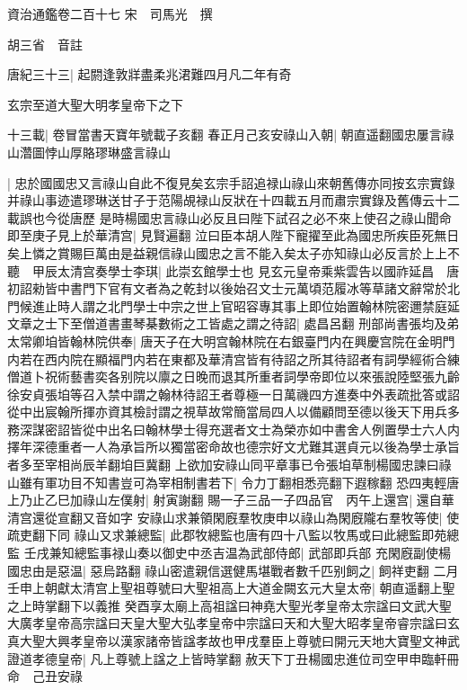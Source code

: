 資治通鑑卷二百十七
宋　司馬光　撰

胡三省　音註

唐紀三十三|{
	起閼逢敦牂盡柔兆涒難四月凡二年有奇}


玄宗至道大聖大明孝皇帝下之下

十三載|{
	卷冒當書天寶年號載子亥翻}
春正月己亥安祿山入朝|{
	朝直遥翻國忠屢言祿山濳圖悖山厚賂璆琳盛言祿山}


|{
	忠於國國忠又言祿山自此不復見矣玄宗手詔追禄山祿山來朝舊傳亦同按玄宗實錄并祿山事迹遣璆琳送甘子于范陽覘禄山反狀在十四載五月而肅宗實錄及舊傳云十二載誤也今從唐歷}
是時楊國忠言祿山必反且曰陛下試召之必不來上使召之祿山聞命即至庚子見上於華清宫|{
	見賢遍翻}
泣曰臣本胡人陛下寵擢至此為國忠所疾臣死無日矣上憐之賞賜巨萬由是益親信祿山國忠之言不能入矣太子亦知祿山必反言於上上不聽　甲辰太清宫奏學士李琪|{
	此崇玄館學士也}
見玄元皇帝乘紫雲告以國祚延昌　唐初詔勑皆中書門下官有文者為之乾封以後始召文士元萬頃范履冰等草諸文辭常於北門候進止時人謂之北門學士中宗之世上官昭容專其事上即位始置翰林院密邇禁庭延文章之士下至僧道書畫琴棊數術之工皆處之謂之待詔|{
	處昌呂翻}
刑部尚書張均及弟太常卿垍皆翰林院供奉|{
	唐天子在大明宫翰林院在右銀臺門内在興慶宫院在金明門内若在西内院在顯福門内若在東都及華清宫皆有待詔之所其待詔者有詞學經術合練僧道卜祝術藝書奕各别院以廪之日晚而退其所重者詞學帝即位以來張說陸堅張九齡徐安貞張垍等召入禁中謂之翰林待詔王者尊極一日萬禨四方進奏中外表疏批答或詔從中出宸翰所揮亦資其檢討謂之視草故常簡當局四人以備顧問至德以後天下用兵多務深謀密詔皆從中出名曰翰林學士得充選者文士為榮亦如中書舍人例置學士六人内擇年深德重者一人為承旨所以獨當密命故也德宗好文尤難其選貞元以後為學士承旨者多至宰相尚辰羊翻垍巨冀翻}
上欲加安祿山同平章事已令張垍草制楊國忠諫曰祿山雖有軍功目不知書豈可為宰相制書若下|{
	令力丁翻相悉亮翻下遐稼翻}
恐四夷輕唐上乃止乙巳加祿山左僕射|{
	射寅謝翻}
賜一子三品一子四品官　丙午上還宫|{
	還自華清宫還從宣翻又音如字}
安祿山求兼領閑廐羣牧庚申以祿山為閑廐隴右羣牧等使|{
	使疏吏翻下同}
祿山又求兼總監|{
	此郡牧總監也唐有四十八監以牧馬或曰此總監即苑總監}
壬戌兼知總監事禄山奏以御史中丞吉温為武部侍郎|{
	武部即兵部}
充閑廐副使楊國忠由是惡温|{
	惡烏路翻}
祿山密遣親信選健馬堪戰者數千匹别飼之|{
	飼祥吏翻}
二月壬申上朝獻太清宫上聖祖尊號曰大聖祖高上大道金闕玄元大皇太帝|{
	朝直遥翻上聖之上時掌翻下以義推}
癸酉享太廟上高祖諡曰神堯大聖光孝皇帝太宗諡曰文武大聖大廣孝皇帝高宗諡曰天皇大聖大弘孝皇帝中宗諡曰天和大聖大昭孝皇帝睿宗諡曰玄真大聖大興孝皇帝以漢家諸帝皆諡孝故也甲戌羣臣上尊號曰開元天地大寶聖文神武證道孝德皇帝|{
	凡上尊號上諡之上皆時掌翻}
赦天下丁丑楊國忠進位司空甲申臨軒冊命　己丑安祿

